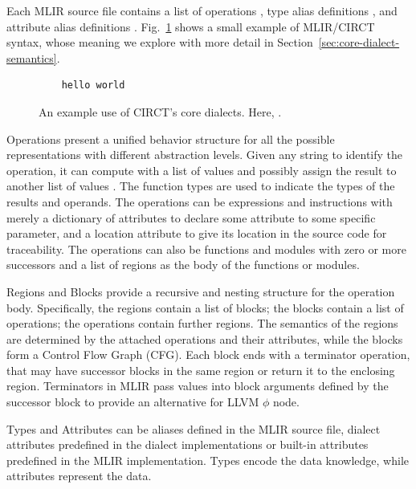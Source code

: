 Each MLIR source file contains a list of operations , type alias definitions , and attribute alias definitions .  Fig.~\ref{fig:circt-example} shows a small example of MLIR/CIRCT syntax, whose meaning we explore with more detail in Section~\ref{sec:core-dialect-semantics}.

\begin{figure}
\centering
\begin{lstlisting}
    hello world
\end{lstlisting}
\caption{An example use of CIRCT's core dialects. Here, . }
\label{fig:circt-example}
\end{figure}

Operations  present a unified behavior structure for all the possible representations with different abstraction levels. Given any string  to identify the operation, it can compute with a list of values  and possibly assign the result to another list of values . The function types  are used to indicate the types of the results and operands. The operations can be expressions and instructions with merely a dictionary of attributes  to declare some attribute to some specific parameter, and a location attribute  to give its location in the source code for traceability. The operations can also be functions and modules with zero or more successors  and a list of regions  as the body of the functions or modules.

Regions  and Blocks  provide a recursive and nesting structure for the operation body. Specifically, the regions contain a list of blocks; the blocks contain a list of operations; the operations contain further regions. The semantics of the regions are determined by the attached operations and their attributes, while the blocks form a Control Flow Graph (CFG). Each block ends with a terminator operation, that may have successor blocks in the same region or return it to the enclosing region. Terminators in MLIR pass values into block arguments  defined by the successor block to provide an alternative for LLVM $\phi$ node.

Types  and Attributes  can be aliases defined in the MLIR source file, dialect attributes predefined in the dialect implementations or built-in attributes predefined in the MLIR implementation. Types encode the data knowledge, while attributes represent the data.

